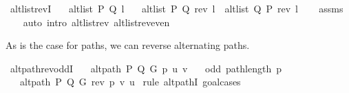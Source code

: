 \begin{isabellebody}
{\isafoldproof}%
%
\isadelimproof
\isanewline
%
\endisadelimproof
%
\isadeliminvisible
\isanewline
%
\endisadeliminvisible
%
\isataginvisible
{}\isamarkupfalse%
\ alt{\isacharunderscore}{\kern0pt}list{\isacharunderscore}{\kern0pt}revI{\isacharcolon}{\kern0pt}\isanewline
\ \ \ {\isachardoublequoteopen}alt{\isacharunderscore}{\kern0pt}list\ P\ Q\ l{\isachardoublequoteclose}\isanewline
\ \ \ {\isachardoublequoteopen}alt{\isacharunderscore}{\kern0pt}list\ P\ Q\ {\isacharparenleft}{\kern0pt}rev\ l{\isacharparenright}{\kern0pt}\ {\isasymor}\ alt{\isacharunderscore}{\kern0pt}list\ Q\ P\ {\isacharparenleft}{\kern0pt}rev\ l{\isacharparenright}{\kern0pt}{\isachardoublequoteclose}%
\endisataginvisible
{\isafoldinvisible}%
%
\isadeliminvisible
\isanewline
%
\endisadeliminvisible
%
\isadelimproof
\ \ %
\endisadelimproof
%
\isatagproof
{}\isamarkupfalse%
\ assms\isanewline
\ \ \isamarkupfalse%
\ {\isacharparenleft}{\kern0pt}auto\ intro{\isacharcolon}{\kern0pt}\ alt{\isacharunderscore}{\kern0pt}list{\isacharunderscore}{\kern0pt}rev\ alt{\isacharunderscore}{\kern0pt}list{\isacharunderscore}{\kern0pt}rev{\isacharunderscore}{\kern0pt}even{\isacharparenright}{\kern0pt}%
\endisatagproof
{\isafoldproof}%
%
\isadelimproof
%
\endisadelimproof
%
\begin{isamarkuptext}%
As is the case for paths, we can reverse alternating paths.%
\end{isamarkuptext}\isamarkuptrue%
\isamarkupfalse%
\ alt{\isacharunderscore}{\kern0pt}path{\isacharunderscore}{\kern0pt}rev{\isacharunderscore}{\kern0pt}oddI{\isacharcolon}{\kern0pt}\isanewline
\ \ \ {\isachardoublequoteopen}alt{\isacharunderscore}{\kern0pt}path\ P\ Q\ G\ p\ u\ v{\isachardoublequoteclose}\isanewline
\ \ \ {\isachardoublequoteopen}odd\ {\isacharparenleft}{\kern0pt}path{\isacharunderscore}{\kern0pt}length\ p{\isacharparenright}{\kern0pt}{\isachardoublequoteclose}\isanewline
\ \ \ {\isachardoublequoteopen}alt{\isacharunderscore}{\kern0pt}path\ P\ Q\ G\ {\isacharparenleft}{\kern0pt}rev\ p{\isacharparenright}{\kern0pt}\ v\ u{\isachardoublequoteclose}\isanewline
%
\isadelimproof
%
\endisadelimproof
%
\isatagproof
{}\isamarkupfalse%
\ {\isacharparenleft}{\kern0pt}rule\ alt{\isacharunderscore}{\kern0pt}pathI{\isacharcomma}{\kern0pt}\ goal{\isacharunderscore}{\kern0pt}cases{\isacharparenright}{\kern0pt}\isanewline
\ \ \isamarkupfalse%
\ {}\isanewline
\ \ \isamarkupfalse%

\end{isabellebody}
